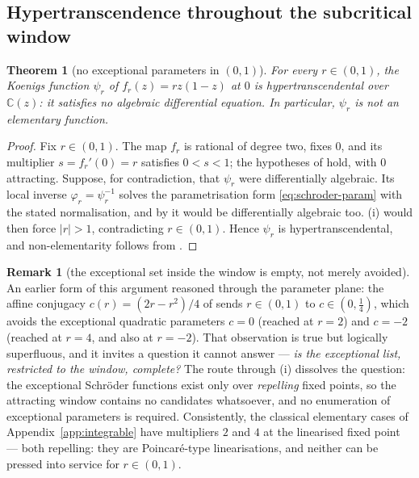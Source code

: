 \documentclass[11pt,a4paper]{article}
\theoremstyle{plain}
\newtheorem{theorem}{Theorem}[section]
\theoremstyle{definition}
\newtheorem{remark}{Remark}[section]
\begin{document}
\subsection{Hypertranscendence throughout the subcritical window}

\begin{theorem}[no exceptional parameters in $(0,1)$]
\label{thm:main-ht}
For every $r\in(0,1)$, the Koenigs function $\psi_r$ of $f_r(z)=rz(1-z)$ at $0$ is hypertranscendental over $\mathbb{C}(z)$: it satisfies no algebraic differential equation. In particular, $\psi_r$ is not an elementary function.
\end{theorem}

\begin{proof}
Fix $r\in(0,1)$. The map $f_r$ is rational of degree two, fixes $0$, and its multiplier $s=f_r'(0)=r$ satisfies $0<s<1$; the hypotheses of  hold, with $0$ attracting. Suppose, for contradiction, that $\psi_r$ were differentially algebraic. Its local inverse $\varphi_r=\psi_r^{-1}$ solves the parametrisation form \eqref{eq:schroder-param} with the stated normalisation, and by  it would be differentially algebraic too. (i) would then force $|r|>1$, contradicting $r\in(0,1)$. Hence $\psi_r$ is hypertranscendental, and non-elementarity follows from .
\end{proof}

\begin{remark}[the exceptional set inside the window is empty, not merely avoided]
\label{rem:empty}
An earlier form of this argument reasoned through the parameter plane: the affine conjugacy $c(r)=(2r-r^{2})/4$ of  sends $r\in(0,1)$ to $c\in(0,\tfrac14)$, which avoids the exceptional quadratic parameters $c=0$ (reached at $r=2$) and $c=-2$ (reached at $r=4$, and also at $r=-2$). That observation is true but logically superfluous, and it invites a question it cannot answer --- \emph{is the exceptional list, restricted to the window, complete?} The route through (i) dissolves the question: the exceptional Schr\"oder functions exist only over \emph{repelling} fixed points, so the attracting window contains no candidates whatsoever, and no enumeration of exceptional parameters is required. Consistently, the classical elementary cases of Appendix~\ref{app:integrable} have multipliers $2$ and $4$ at the linearised fixed point --- both repelling: they are Poincar\'e-type linearisations, and neither can be pressed into service for $r\in(0,1)$.
\end{remark}
\end{document}
